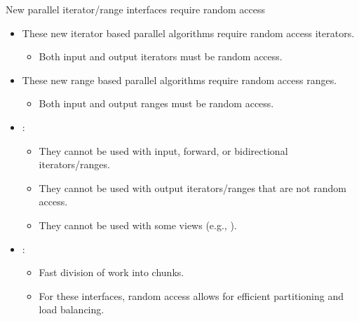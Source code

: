 \begin{frame}[t,fragile]{New parallel iterator/range interfaces require random access}
\begin{itemize}
    \item These new iterator based parallel algorithms require random access iterators.
      \begin{itemize}
        \item Both input and output iterators must be random access.
      \end{itemize}

    \item These new range based parallel algorithms require random access ranges.
      \begin{itemize}
        \item Both input and output ranges must be random access.
      \end{itemize}

    \item {}:
      \begin{itemize}
        \item They cannot be used with input, forward, or bidirectional iterators/ranges.
        \item They cannot be used with output iterators/ranges that are not random access.
        \item They cannot be used with some views (e.g., ).
      \end{itemize}

    \item {}:
      \begin{itemize}
        \item Fast division of work into chunks.
        \item For these interfaces, random access allows for efficient partitioning and load balancing.
      \end{itemize}
\end{itemize}
\end{frame}

